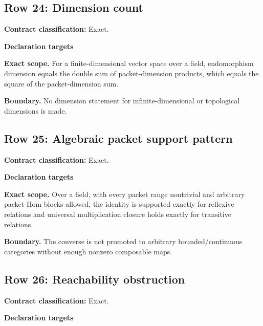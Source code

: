 \medskip
{}\subsection{Row 24: Dimension count}
\label{row:24}
\textbf{Contract classification:} Exact.
\par\smallskip\textbf{Declaration targets}\par
{\small\noindent{}\par}
{\small\noindent{}\par}
\medskip\noindent\textbf{Exact scope.} For a finite-dimensional vector space over a field, endomorphism dimension equals the double sum of packet-dimension products, which equals the square of the packet-dimension sum.
\par\smallskip\noindent\textbf{Boundary.} No dimension statement for infinite-dimensional or topological dimensions is made.
\medskip
{}\subsection{Row 25: Algebraic packet support pattern}
\label{row:25}
\textbf{Contract classification:} Exact.
\par\smallskip\textbf{Declaration targets}\par
{\small\noindent{}\par}
{\small\noindent{}\par}
\medskip\noindent\textbf{Exact scope.} Over a field, with every packet range nontrivial and arbitrary packet-Hom blocks allowed, the identity is supported exactly for reflexive relations and universal multiplication closure holds exactly for transitive relations.
\par\smallskip\noindent\textbf{Boundary.} The converse is not promoted to arbitrary bounded/continuous categories without enough nonzero composable maps.
\medskip
{}\subsection{Row 26: Reachability obstruction}
\label{row:26}
\textbf{Contract classification:} Exact.
\par\smallskip\textbf{Declaration targets}\par
